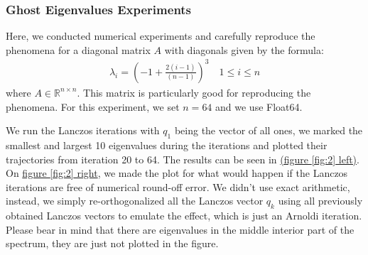 \documentclass[]{article}
\theoremstyle{definition}
\begin{document}
        \subsubsection{Ghost Eigenvalues Experiments}
            Here, we conducted numerical experiments and carefully reproduce the phenomena for a diagonal matrix $A$ with diagonals given by the formula: 
            \begin{align}
                \lambda_i = \left(-1 + \frac{2(i - 1)}{(n - 1)}\right)^3 \quad 1\le i \le n
            \end{align}\label{eqn:the_ill_conditioned_matrix}
            where $A\in \mathbb R^{n\times n}$. This matrix is particularly good for reproducing the phenomena. For this experiment, we set $n = 64$ and we use Float64. 
            \par
            We run the Lanczos iterations with $q_1$ being the vector of all ones, we marked the smallest and largest 10 eigenvalues during the iterations and plotted their trajectories from iteration 20 to 64. The results can be seen in \hyperref[fig:2]{(figure \ref*{fig:2} left)}. On \hyperref[fig:2]{figure \ref*{fig:2} right}, we made the plot for what would happen if the Lanczos iterations are free of numerical round-off error. We didn't use exact arithmetic, instead, we simply re-orthogonalized all the Lanczos vector $q_k$ using all previously obtained Lanczos vectors to emulate the effect, which is just an Arnoldi iteration. Please bear in mind that there are eigenvalues in the middle interior part of the spectrum, they are just not plotted in the figure. 
\end{document}
